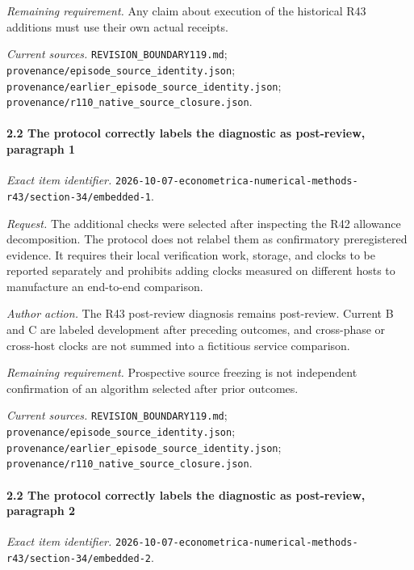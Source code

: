\par\emph{Remaining requirement.} Any claim about execution of the historical R43 additions must use their own actual receipts.

\par\emph{Current sources.} \nolinkurl{REVISION_BOUNDARY119.md}; \nolinkurl{provenance/episode_source_identity.json}; \nolinkurl{provenance/earlier_episode_source_identity.json}; \nolinkurl{provenance/r110_native_source_closure.json}.

\paragraph{2.2 The protocol correctly labels the diagnostic as post-review, paragraph 1}

\emph{Exact item identifier.} \nolinkurl{2026-10-07-econometrica-numerical-methods-r43/section-34/embedded-1}.

\par\emph{Request.} The additional checks were selected after inspecting the R42 allowance decomposition. The protocol does not relabel them as confirmatory preregistered evidence. It requires their local verification work, storage, and clocks to be reported separately and prohibits adding clocks measured on different hosts to manufacture an end-to-end comparison.

\par\emph{Author action.} The R43 post-review diagnosis remains post-review. Current B and C are labeled development after preceding outcomes, and cross-phase or cross-host clocks are not summed into a fictitious service comparison.

\par\emph{Remaining requirement.} Prospective source freezing is not independent confirmation of an algorithm selected after prior outcomes.

\par\emph{Current sources.} \nolinkurl{REVISION_BOUNDARY119.md}; \nolinkurl{provenance/episode_source_identity.json}; \nolinkurl{provenance/earlier_episode_source_identity.json}; \nolinkurl{provenance/r110_native_source_closure.json}.

\paragraph{2.2 The protocol correctly labels the diagnostic as post-review, paragraph 2}

\emph{Exact item identifier.} \nolinkurl{2026-10-07-econometrica-numerical-methods-r43/section-34/embedded-2}.

